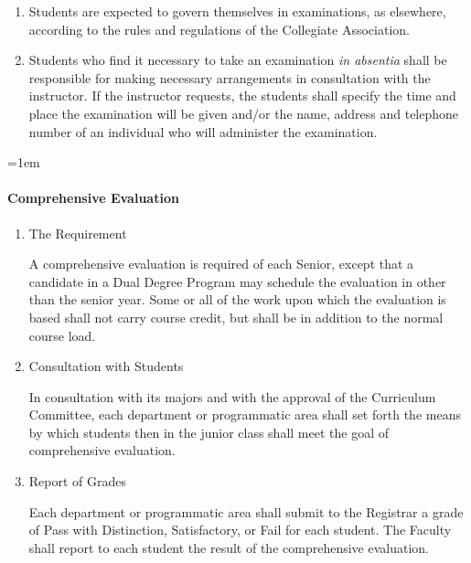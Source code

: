 \documentclass{manual}
\let\oldparagraph\paragraph
\renewcommand\paragraph{\leftskip=1em\oldparagraph}
\newcommand{\itemLevelA}{\alph*.}
\newcommand{\itemLevelB}{\arabic*)}
\newcommand{\itemRefA}{\alph*}
\newcommand{\itemRefB}{\arabic*}
\begin{document}
\begin{enumerate}[label=\alph*]
					\begin{enumerate}[label=\itemLevelB,ref=\itemRefB]
					\item Students are expected to govern themselves in examinations, as elsewhere, according to the rules and regulations of the Collegiate Association.
					\item Students who find it necessary to take an examination \textit{in absentia} shall be responsible for making necessary arrangements in consultation with the instructor. If the instructor requests, the students shall specify the time and place the examination will be given and/or the name, address and telephone number of an individual who will administer the examination.
					\end{enumerate}
				
				\end{enumerate}

			\paragraph{Comprehensive Evaluation}

				\begin{enumerate}[label=\itemLevelA,ref=\itemRefA]
				\item The Requirement

					A comprehensive evaluation is required of each Senior, except that a candidate in a Dual Degree Program may schedule the evaluation in other than the senior year. Some or all of the work upon which the evaluation is based shall not carry course credit, but shall be in addition to the normal course load.

				\item Consultation with Students

					In consultation with its  majors and with the approval of the Curriculum Committee, each department or programmatic area shall  set forth the means by which students then in the junior class shall meet the goal of comprehensive evaluation.
				
				\item Report of Grades

					Each department or programmatic area shall submit to the Registrar a grade of Pass with Distinction, Satisfactory, or Fail for each student. The Faculty shall report to each student the result of the comprehensive evaluation.
				
				\end{enumerate}
\end{document}
